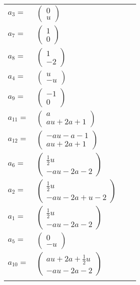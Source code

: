 \documentclass[1p]{elsarticle_modified}
\theoremstyle{definition}
\begin{document}
\begin{tabular}{m{7pt} m{180pt} m{7pt} m{180pt} }
\flushright $a_{3}=$&$\begin{pmatrix}0\\u\end{pmatrix}$ \\
\flushright $a_{7}=$&$\begin{pmatrix}1\\0\end{pmatrix}$ \\
\flushright $a_{8}=$&$\begin{pmatrix}1\\-2\end{pmatrix}$ \\
\flushright $a_{4}=$&$\begin{pmatrix}u\\- u\end{pmatrix}$ \\
\flushright $a_{9}=$&$\begin{pmatrix}-1\\0\end{pmatrix}$ \\
\flushright $a_{11}=$&$\begin{pmatrix}a\\a u+2 a+1\end{pmatrix}$ \\
\flushright $a_{12}=$&$\begin{pmatrix}- a u- a-1\\a u+2 a+1\end{pmatrix}$ \\
\flushright $a_{6}=$&$\begin{pmatrix}\frac{1}{2} u\\- a u-2 a-2\end{pmatrix}$ \\
\flushright $a_{2}=$&$\begin{pmatrix}\frac{1}{2} u\\- a u-2 a+u-2\end{pmatrix}$ \\
\flushright $a_{1}=$&$\begin{pmatrix}\frac{1}{2} u\\- a u-2 a-2\end{pmatrix}$ \\
\flushright $a_{5}=$&$\begin{pmatrix}0\\- u\end{pmatrix}$ \\
\flushright $a_{10}=$&$\begin{pmatrix}a u+2 a+\frac{1}{2} u\\- a u-2 a-2\end{pmatrix}$\\&\end{tabular}
\end{document}
